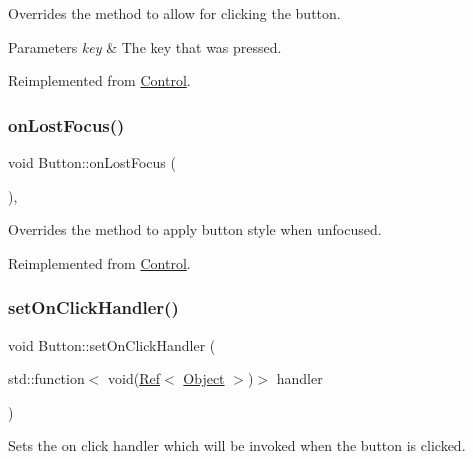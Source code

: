 Overrides the method to allow for clicking the button. 


\begin{DoxyParams}{Parameters}
{\em key} & The key that was pressed.\\
\hline
\end{DoxyParams}


Reimplemented from \mbox{\hyperlink{class_control_a4731a62a9ea0510d51924509ae74c93e}{Control}}.

\mbox{\label{class_button_ac80b96f804bcb1a8cdf1b8617be02c55}} 
\subsubsection{\texorpdfstring{onLostFocus()}{onLostFocus()}}
{\footnotesize\ttfamily void Button\+::on\+Lost\+Focus (\begin{DoxyParamCaption}{ }\end{DoxyParamCaption})\hspace{0.3cm}{\ttfamily [override]}, {\ttfamily [virtual]}}



Overrides the method to apply button style when unfocused. 



Reimplemented from \mbox{\hyperlink{class_control_abbc8ce4460f790b4a5cf3dcb102b3f46}{Control}}.

\mbox{\label{class_button_a05e05f2a1b0055dcaa69b231a52f86e4}} 
\subsubsection{\texorpdfstring{setOnClickHandler()}{setOnClickHandler()}}
{\footnotesize\ttfamily void Button\+::set\+On\+Click\+Handler (\begin{DoxyParamCaption}\item[{std\+::function$<$ void(\mbox{\hyperlink{class_ref}{Ref}}$<$ \mbox{\hyperlink{class_object}{Object}} $>$)$>$}]{handler }\end{DoxyParamCaption})}



Sets the on click handler which will be invoked when the button is clicked. 


